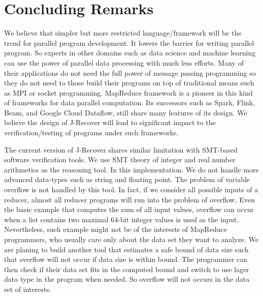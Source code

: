 \documentclass{llncs}
\begin{document}
\section{Concluding Remarks}
We believe that simpler but more restricted language/framework will be the trend for parallel program development. It lowers the barrier for writing parallel program. So experts in other domains such as data science and machine learning can use the power of parallel data processing with much less efforts. Many of their applications do not need the full power of message passing programming so they do not need to those build their programs on top of traditional means such as MPI or socket programming. MapReduce framework is a pioneer in this kind of frameworks for data parallel computation. Its successors such as Spark, Flink, Beam, and Google Cloud Dataflow, still share many features of its design. We believe the design of J-Recover will lead to significant impact to the verification/testing of programs under such frameworks. 

The current version of J-Recover shares similar limitation with SMT-based software verification tools.
We use SMT theory of integer and real number arithmetics as the reasoning tool. In this implementation. We do not handle more advanced data-types such as string and floating point. The problem of variable overflow is not handled by this tool. In fact, if we consider all possible inputs of a reducer, almost all reducer programs will run into the problem of overflow. Even the basic example that computes the sum of all input values, overflow can occur when a list contains two maximal 64-bit integer values is used as the input. Nevertheless, such example might not be of the interests of MapReduce programmers, who usually care only about the data set they want to analyze. We are planing to build another tool that estimates a safe bound of data size such that overflow will not occur if data size is within bound. The programmer can then check if their data set fits in the computed bound and switch to use lager data type in the program when needed. So overflow will not occurs in the data set of interests.



%

\end{document}

